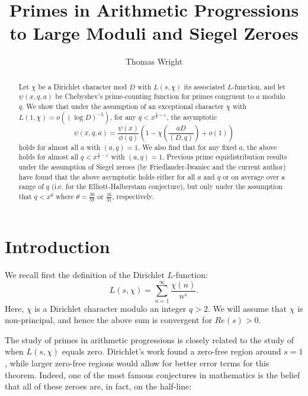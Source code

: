 \documentclass{amsart}
\begin{document}
\title{Primes in Arithmetic Progressions to Large Moduli and Siegel Zeroes}
\author[T. Wright]{Thomas Wright}
\address{Wofford College\\429 N. Church St.\\Spartanburg, SC 29302\\USA}
\maketitle



\begin{abstract}
Let $\chi$ be a Dirichlet character mod $D$ with $L(s,\chi)$ its associated $L$-function, and let $\psi(x,q,a)$ be Chebyshev's prime-counting function for primes congruent to $a$ modulo $q$.  We show that under the assumption of an exceptional character $\chi$ with $L(1,\chi)=o\left((\log D)^{-5}\right)$, for any $q<x^{\frac 23-\varepsilon}$, the asymptotic
$$\psi(x,q,a)=\frac{\psi(x)}{\phi(q)}\left(1-\chi\left(\frac{aD}{(D,q)}\right)+o(1)\right)$$
holds for almost all $a$ with $(a,q)=1$.  We also find that for any fixed $a$, the above holds for almost all $q<x^{\frac 23-\varepsilon}$ with $(a,q)=1$.
Previous prime equidistribution results under the assumption of Siegel zeroes (by Friedlander-Iwaniec and the current author) have found that the above asymptotic holds either for all $a$ and $q$ or on average over a range of $q$ (i.e. for the Elliott-Halberstam conjecture), but only under the assumption that $q<x^{\theta}$ where $\theta=\frac{30}{59}$ or $\frac{16}{31}$, respectively.
\end{abstract}

\section{Introduction}

We recall first the definition of the Dirichlet $L$-function:
$$L(s,\chi)=\sum_{n=1}^\infty \frac{\chi(n)}{n^s}.$$
Here, $\chi$ is a Dirichlet character modulo an integer $q>2$.  We will assume that $\chi$ is non-principal, and hence the above sum is convergent for $Re(s)>0$.

The study of primes in arithmetic progressions is closely related to the study of when $L(s,\chi)$ equals zero.  Dirichlet's work found a zero-free region around $s=1$, while larger zero-free regions would allow for better error terms for this theorem.  Indeed, one of the most famous conjectures in mathematics is the belief that all of these zeroes are, in fact, on the half-line:
\end{document}
